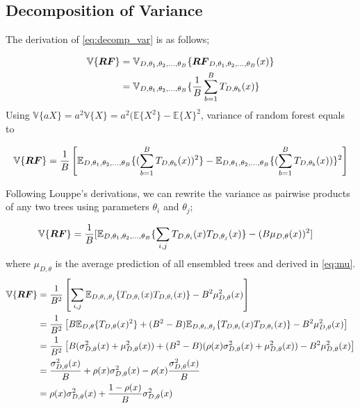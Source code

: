 \subsection{Decomposition of Variance}
The derivation of \autoref{eq:decomp_var} is as follows;

\begin{align}
\mathbb{V}\{\boldsymbol{RF}\} & = \mathbb{V}_{D, \theta_{1}, \theta_{2},..., \theta_{B}}\{\boldsymbol{RF}_{D, \theta_{1},\theta_{2},..., \theta_{B}}(x) \}\notag \\
& = \mathbb{V}_{D, \theta_{1}, \theta_{2},..., \theta_{B}}\{\dfrac{1}{B}\sum_{b=1}^{B} T_{D,\theta_{b}}(x)\} \notag
\end{align}
Using $\mathbb{V}\{aX\} = a^2\mathbb{V}\{X\} = a^2 (\mathbb{E}\{X^2\} - \mathbb{E}\{X\}^2$, variance of random forest equals to

\begin{align}
\mathbb{V}\{\boldsymbol{RF}\} = \dfrac{1}{B}\left[\mathbb{E}_{D, \theta_{1}, \theta_{2},..., \theta_{B}}\{( \sum_{b=1}^{B} T_{D, \theta_{b}}(x))^2 \} - \mathbb{E}_{D, \theta_{1}, \theta_{2},..., \theta_{B}}\{( \sum_{b=1}^{B} T_{D, \theta_{b}}(x)) \}^2\right] \notag
\end{align}

Following Louppe's derivations, we can rewrite the variance as pairwise products of any two trees using parameters $\theta_{i}$ and $\theta_{j}$;

\begin{align}
\mathbb{V}\{\boldsymbol{RF}\} & = \dfrac{1}{B}[\mathbb{E}_{D, \theta_{1}, \theta_{2},..., \theta_{B}}\{\sum_{i,j} T_{D,\theta_{i}}(x) T_{D,\theta_{j}}(x)\} - (B \mu_{D,\theta}(x))^2] \notag
\end{align}
where $\mu_{D, \theta}$ is the average prediction of all ensembled trees and derived in \autoref{eq:mu}.
\begin{align}
\mathbb{V}\{\boldsymbol{RF}\} & = \dfrac{1}{B^2}\left[\sum_{i,j} \mathbb{E}_{D, \theta_{i}, \theta_{j}}\{T_{D,\theta_{i}}(x) T_{D,\theta_{i}}(x)\} - B^2 \mu_{D,\theta}^2(x)\right]\notag \\
& = \dfrac{1}{B^2}\left[B\mathbb{E}_{D,\theta}\{T_{D,\theta}(x)^2\} + (B^2 - B) \mathbb{E}_{D, \theta_{i}, \theta_{j}}\{T_{D,\theta_{i}}(x) T_{D,\theta_{i}}(x)\} - B^2 \mu_{D,\theta}^2(x)\right]\notag \\
& = \dfrac{1}{B^2}\left[B(\sigma_{D,\theta}^2(x) + \mu_{D,\theta}^2(x)) + (B^2 - B) (\rho(x)\sigma_{D,\theta}^2(x) + \mu_{D, \theta}^2(x)) - B^2 \mu_{D,\theta}^2(x)\right] \notag \\
& = \dfrac{\sigma_{D,\theta}^2(x)}{B} + \rho(x)\sigma_{D,\theta}^2(x) - \rho(x)\dfrac{\sigma_{D,\theta}^2(x)}{B}\notag \\
& = \rho(x)\sigma_{D,\theta}^2(x) + \dfrac{1 - \rho(x)}{B}\sigma_{D,\theta}^2(x) \notag
\end{align}
